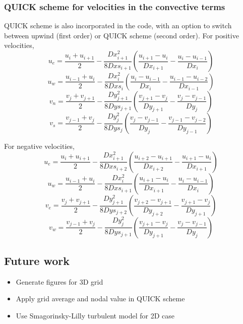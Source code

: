 \documentclass[12pt,a4paper,fleqn]{article}
\begin{document}
\subsubsection{QUICK scheme for velocities in the convective terms}
QUICK scheme is also incorporated in the code, with an option to switch between upwind (first order) or QUICK scheme (second order). For positive velocities,
\begin{equation*}
u_e = \frac{u_{i} + u_{i+1}}{2} - \frac{Dx_{i+1}^2}{8Dxs_{i+1}}
\left(\frac{u_{i+1} - u_{i}}{Dx_{i+1}} - \frac{u_{i} - u_{i-1}}{Dx_{i}}\right)
\end{equation*}
\begin{equation*}
u_w = \frac{u_{i-1} + u_{i}}{2} - \frac{Dx_{i}^2}{8Dxs_{i}}
\left(\frac{u_{i} - u_{i-1}}{Dx_{i}} - \frac{u_{i-1} - u_{i-2}}{Dx_{i-1}}\right)
\end{equation*}
\begin{equation*}
v_n = \frac{v_{j} + v_{j+1}}{2} - \frac{Dy_{j+1}^2}{8Dys_{j+1}}
\left(\frac{v_{j+1} - v_{j}}{Dy_{j+1}} - \frac{v_{j} - v_{j-1}}{Dy_{j}}\right)
\end{equation*}
\begin{equation*}
v_s = \frac{v_{j-1} + v_{j}}{2} - \frac{Dy_{j}^2}{8Dys_{j}}
\left(\frac{v_{j} - v_{j-1}}{Dy_{j}} - \frac{v_{j-1} - v_{j-2}}{Dy_{j-1}}\right)
\end{equation*}

For negative velocities,
\begin{equation*}
u_e = \frac{u_{i} + u_{i+1}}{2} - \frac{Dx_{i+1}^2}{8Dxs_{i+2}}
\left(\frac{u_{i+2} - u_{i+1}}{Dx_{i+2}} - \frac{u_{i+1} - u_{i}}{Dx_{i+1}}
\right)
\end{equation*}
\begin{equation*}
u_w = \frac{u_{i-1} + u_{i}}{2} - \frac{Dx_{i}^2}{8Dxs_{i+1}}
\left(\frac{u_{i+1} - u_{i}}{Dx_{i+1}} - \frac{u_{i} - u_{i-1}}{Dx_{i}}\right)
\end{equation*}
\begin{equation*}
v_e = \frac{v_{j} + v_{j+1}}{2} - \frac{Dy_{j+1}^2}{8Dys_{j+2}}
\left(\frac{v_{j+2} - v_{j+1}}{Dy_{j+2}} - \frac{v_{j+1} - v_{j}}{Dy_{j+1}}
\right)
\end{equation*}
\begin{equation*}
v_w = \frac{v_{j-1} + v_{j}}{2} - \frac{Dy_{j}^2}{8Dys_{j+1}}
\left(\frac{v_{j+1} - v_{j}}{Dy_{j+1}} - \frac{v_{j} - v_{j-1}}{Dy_{j}}\right)
\end{equation*}

\newpage

\subsection{Future work}
\begin{itemize}
\item Generate figures for 3D grid
\item Apply grid average and nodal value in QUICK scheme
\item Use Smagorinsky-Lilly turbulent model for 2D case
\end{itemize}
\end{document}
